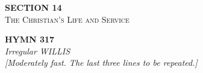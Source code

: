 \documentclass[11pt,a4paper]{article}
\begin{document}
\newpage
\thispagestyle{empty}
\vspace*{3.5cm}
\begin{center}
    {\LARGE \textbf{SECTION 14}}\\[0.8em]
    {\Large \textsc{The Christian's Life and Service}}
\end{center}
\vspace{3.5cm}

\newpage
\begin{center}
    {\Large \textbf{HYMN 317}}
    \\
    \textit{Irregular WILLIS}
    \\
    \textit{\small [Moderately fast. The last three lines to be repeated.]}
\end{center}
\vspace{1em}
\end{document}
